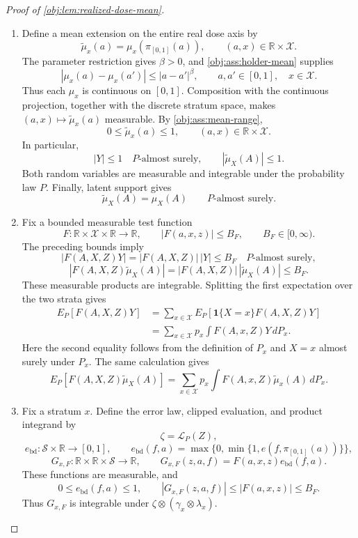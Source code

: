 \begin{proof}[Proof of \cref{obj:lem:realized-dose-mean}]
\begin{enumerate}
\item Define a mean extension on the entire real dose axis by
\[
\widetilde\mu_x(a)=\mu_x(\pi_{[0,1]}(a)),
\qquad (a,x)\in\mathbb R\times\mathcal X.
\]
The parameter restriction gives \(\beta>0\), and
\cref{obj:ass:holder-mean} supplies
\[
|\mu_x(a)-\mu_x(a')|\le |a-a'|^\beta,
\qquad a,a'\in[0,1],\quad x\in\mathcal X.
\]
Thus each \(\mu_x\) is continuous on \([0,1]\). Composition with the continuous projection, together with the discrete stratum space, makes
\((a,x)\mapsto\widetilde\mu_x(a)\) measurable.
By \cref{obj:ass:mean-range},
\[
0\le\widetilde\mu_x(a)\le1,
\qquad (a,x)\in\mathbb R\times\mathcal X.
\]
In particular,
\[
|Y|\le1\quad P\text{-almost surely},
\qquad
|\widetilde\mu_X(A)|\le1.
\]
Both random variables are measurable and integrable under the probability law \(P\).
Finally, latent support gives
\[
\widetilde\mu_X(A)=\mu_X(A)
\qquad P\text{-almost surely}.
\]

\item Fix a bounded measurable test function
\[
F:\mathbb R\times\mathcal X\times\mathbb R\longrightarrow\mathbb R,
\qquad
|F(a,x,z)|\le B_F,
\qquad B_F\in[0,\infty).
\]
The preceding bounds imply
\[
|F(A,X,Z)Y|
=|F(A,X,Z)|\,|Y|\le B_F
\quad P\text{-almost surely},
\]
\[
|F(A,X,Z)\widetilde\mu_X(A)|
=|F(A,X,Z)|\,|\widetilde\mu_X(A)|\le B_F.
\]
These measurable products are integrable. Splitting the first expectation over the two strata gives
\[
\begin{aligned}
E_P[F(A,X,Z)Y]
&=\sum_{x\in\mathcal X}
 E_P[\mathbf1\{X=x\}F(A,X,Z)Y]\\
&=\sum_{x\in\mathcal X}p_x
 \int F(A,x,Z)Y\,dP_x.
\end{aligned}
\]
Here the second equality follows from the definition of \(P_x\) and \(X=x\) almost surely under \(P_x\). The same calculation gives
\[
E_P[F(A,X,Z)\widetilde\mu_X(A)]
=\sum_{x\in\mathcal X}p_x
 \int F(A,x,Z)\widetilde\mu_x(A)\,dP_x.
\]

\item Fix a stratum \(x\). Define the error law, clipped evaluation, and product integrand by
\[
\zeta=\mathcal L_P(Z),
\]
\[
e_{\mathrm{bd}}:\mathcal S\times\mathbb R\longrightarrow[0,1],
\qquad
e_{\mathrm{bd}}(f,a)
=\max\{0,\min\{1,e(f,\pi_{[0,1]}(a))\}\},
\]
\[
G_{x,F}:\mathbb R\times\mathbb R\times\mathcal S\longrightarrow\mathbb R,
\qquad
G_{x,F}(z,a,f)=F(a,x,z)e_{\mathrm{bd}}(f,a).
\]
These functions are measurable, and
\[
0\le e_{\mathrm{bd}}(f,a)\le1,
\qquad
|G_{x,F}(z,a,f)|
\le |F(a,x,z)|\le B_F.
\]
Thus \(G_{x,F}\) is integrable under \(\zeta\otimes(\gamma_x\otimes\lambda_x)\).


\end{enumerate}
\end{proof}
